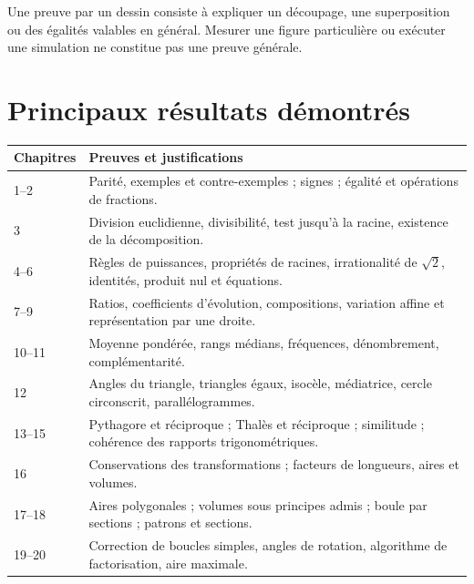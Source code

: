 \documentclass[11pt,a4paper,oneside]{book}
\begin{document}
Une preuve par un dessin consiste à expliquer un découpage, une superposition ou des égalités valables en général. Mesurer une figure particulière ou exécuter une simulation ne constitue pas une preuve générale.
\section{Principaux résultats démontrés}
\begin{center}
\begin{tabularx}{\textwidth}{lX}
\toprule Chapitres & Preuves et justifications\\\midrule
1--2 & Parité, exemples et contre-exemples ; signes ; égalité et opérations de fractions.\\
3 & Division euclidienne, divisibilité, test jusqu'à la racine, existence de la décomposition.\\
4--6 & Règles de puissances, propriétés de racines, irrationalité de $\sqrt2$, identités, produit nul et équations.\\
7--9 & Ratios, coefficients d'évolution, compositions, variation affine et représentation par une droite.\\
10--11 & Moyenne pondérée, rangs médians, fréquences, dénombrement, complémentarité.\\
12 & Angles du triangle, triangles égaux, isocèle, médiatrice, cercle circonscrit, parallélogrammes.\\
13--15 & Pythagore et réciproque ; Thalès et réciproque ; similitude ; cohérence des rapports trigonométriques.\\
16 & Conservations des transformations ; facteurs de longueurs, aires et volumes.\\
17--18 & Aires polygonales ; volumes sous principes admis ; boule par sections ; patrons et sections.\\
19--20 & Correction de boucles simples, angles de rotation, algorithme de factorisation, aire maximale.\\\bottomrule
\end{tabularx}
\end{center}
\end{document}
